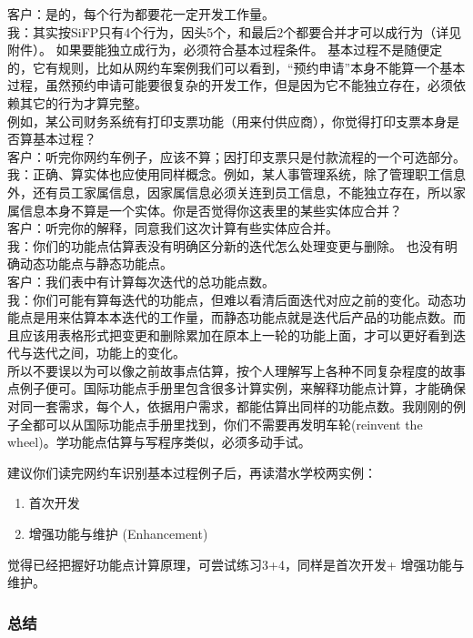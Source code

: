 {\begin{minipage}[t]{0.97\columnwidth}
客户：是的，每个行为都要花一定开发工作量。\\
我：其实按SiFP只有4个行为，因头5个，和最后2个都要合并才可以成行为（详见附件）。
如果要能独立成行为，必须符合基本过程条件。
基本过程不是随便定的，它有规则，比如从网约车案例我们可以看到，``预约申请''本身不能算一个基本过程，虽然预约申请可能要很复杂的开发工作，但是因为它不能独立存在，必须依赖其它的行为才算完整。\\
例如，某公司财务系统有打印支票功能（用来付供应商），你觉得打印支票本身是否算基本过程？\\
客户：听完你网约车例子，应该不算；因打印支票只是付款流程的一个可选部分。\\
我：正确、算实体也应使用同样概念。例如，某人事管理系统，除了管理职工信息外，还有员工家属信息，因家属信息必须关连到员工信息，不能独立存在，所以家属信息本身不算是一个实体。你是否觉得你这表里的某些实体应合并？\\
客户：听完你的解释，同意我们这次计算有些实体应合并。\\
我：你们的功能点估算表没有明确区分新的迭代怎么处理变更与删除。
也没有明确动态功能点与静态功能点。\\
客户：我们表中有计算每次迭代的总功能点数。\\
我：你们可能有算每迭代的功能点，但难以看清后面迭代对应之前的变化。动态功能点是用来估算本本迭代的工作量，而静态功能点就是迭代后产品的功能点数。而且应该用表格形式把变更和删除累加在原本上一轮的功能上面，才可以更好看到迭代与迭代之间，功能上的变化。\\
所以不要误以为可以像之前故事点估算，按个人理解写上各种不同复杂程度的故事点例子便可。国际功能点手册里包含很多计算实例，来解释功能点计算，才能确保对同一套需求，每个人，依据用户需求，都能估算出同样的功能点数。我刚刚的例子全都可以从国际功能点手册里找到，你们不需要再发明车轮(reinvent
the wheel)。学功能点估算与写程序类似，必须多动手试。

建议你们读完网约车识别基本过程例子后，再读潜水学校两实例：

\begin{enumerate}
\tightlist
\item
  首次开发
\item
  增强功能与维护 (Enhancement)
\end{enumerate}

觉得已经把握好功能点计算原理，可尝试练习3+4，同样是首次开发+
增强功能与维护。\strut
\end{minipage}}

\hypertarget{ux603bux7ed3}{%
\subsubsection{总结}\label{ux603bux7ed3}}

